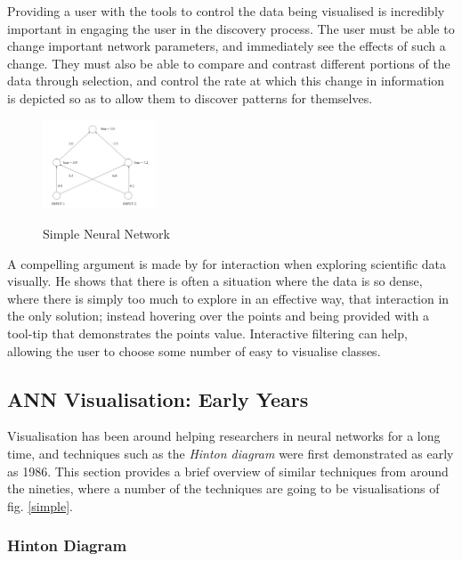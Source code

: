 \documentclass[a4paper,11pt,titlepage]{article}
\begin{document}
		Providing a user with the tools to control the data being visualised is incredibly important in engaging the user in the discovery process. The user must be able to change important network parameters, and immediately see the effects of such a change. They must also be able to compare and contrast different portions of the data through selection, and control the rate at which this change in information is depicted so as to allow them to discover patterns for themselves. 
		\par 		
		 		
	\begin{figure}[H]
    			\centering	
			{{\includegraphics[width=0.3\textwidth]
    				{img/craven_simple_net.png} 
    			}}%
    			\caption{Simple Neural Network}%
    		\label{fig:simple}
	\end{figure} 		
 		
A compelling argument is made by  for interaction when exploring scientific data visually. He shows that there is often a situation where the data is so dense, where there is simply too much to explore in an effective way, that interaction in the only solution; instead hovering over the points and being provided with a tool-tip that demonstrates the points value. Interactive filtering can help, allowing the user to choose some number of easy to visualise classes. 

	\subsection{ANN Visualisation: Early Years}
 		
	 Visualisation has been around helping researchers in neural networks for a long time, and techniques such as the \textit{Hinton diagram} were first demonstrated as early as 1986. This section provides a brief overview of similar techniques from around the nineties, where a number of the techniques are going to be visualisations of fig. \ref{simple}.
		
		\subsubsection{Hinton Diagram}
		 		
\end{document}
